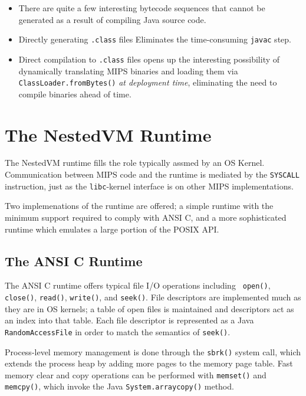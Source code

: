 \documentclass{acmconf}
\begin{document}
\begin{itemize}
      
\item There are quite a few interesting bytecode sequences that cannot
      be generated as a result of compiling Java source code.

\item Directly generating {\tt .class} files Eliminates the
      time-consuming {\tt javac} step.

\item Direct compilation to {\tt .class} files opens up the
      interesting possibility of dynamically translating MIPS binaries
      and loading them via {\tt ClassLoader.fromBytes()} {\it at
      deployment time}, eliminating the need to compile binaries ahead
      of time.

\end{itemize}


\section{The NestedVM Runtime}

The NestedVM runtime fills the role typically assmed by an OS Kernel.
Communication between MIPS code and the runtime is mediated by the
{\tt SYSCALL} instruction, just as the {\tt libc}-kernel interface is
on other MIPS implementations.

Two implemenations of the runtime are offered; a simple runtime with
the minimum support required to comply with ANSI C, and a more
sophisticated runtime which emulates a large portion of the POSIX API.

\subsection{The ANSI C Runtime}

The ANSI C runtime offers typical file I/O operations including {\tt
open()}, {\tt close()}, {\tt read()}, {\tt write()}, and {\tt seek()}.
File descriptors are implemented much as they are in OS kernels; a
table of open files is maintained and descriptors act as an index into
that table.  Each file descriptor is represented as a Java {\tt
RandomAccessFile} in order to match the semantics of {\tt seek()}.

Process-level memory management is done through the {\tt sbrk()}
system call, which extends the process heap by adding more pages to
the memory page table.  Fast memory clear and copy operations can be
performed with {\tt memset()} and {\tt memcpy()}, which invoke the
Java {\tt System.arraycopy()} method.
\end{document}
